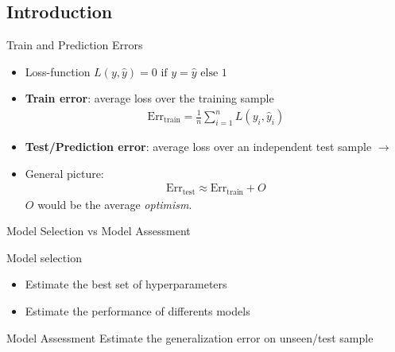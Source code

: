 \subsection{Introduction}
\begin{frame}{Train and Prediction Errors}
  \begin{itemize}
  \item Loss-function \(L(y, \hat{y}) = 0 \text{ if } y=\hat{y} \text{ else } 1\)
    
  \item \textbf{Train error}: average loss over the training sample
    \begin{eqnarray*}
      \text{Err}_{\text{train}} = \frac{1}{n}\sum_{i=1}^nL(y_i, \hat{y}_i)
    \end{eqnarray*}
  \item \textbf{Test/Prediction error}: average loss over an independent test sample \(\to\)  
    
  \item General picture:  
    \begin{eqnarray*}
      \text{Err}_{\text{test}} \approx \text{Err}_{\text{train}}  + O
    \end{eqnarray*}
    \(O\) would be the average \emph{optimism}.
  \end{itemize}  
\end{frame}

\begin{frame}{Model Selection vs Model Assessment}
  \begin{block}{Model selection}
    \begin{itemize}
    \item Estimate the best set of hyperparameters
    \item Estimate the performance of differents models
    \end{itemize}    
  \end{block}

  \begin{block}{Model Assessment}
    Estimate the generalization error on unseen/test sample    
  \end{block}
  \vspace{1cm}
  
\end{frame}

